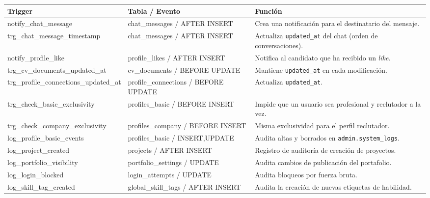 \clearpage
\vspace{0.2cm}
\noindent
\renewcommand{\arraystretch}{1.25}
\fontsize{8.2}{9.8}\selectfont\sffamily
\begin{tabularx}{\textwidth}{|>{\ttfamily\color{colorPrimario}\scriptsize}l|>{\scriptsize}l|X|}
\hline
\rowcolor{headerTabla}
\sffamily\textbf{Trigger} & \sffamily\textbf{Tabla / Evento} & \sffamily\textbf{Función} \\
\hline
notify\_chat\_message & chat\_messages / AFTER INSERT & Crea una notificación para el destinatario del mensaje. \\
\hline
\rowcolor{grisTecnico}
trg\_chat\_message\_timestamp & chat\_messages / AFTER INSERT & Actualiza \texttt{updated\_at} del chat (orden de conversaciones). \\
\hline
notify\_profile\_like & profile\_likes / AFTER INSERT & Notifica al candidato que ha recibido un \textit{like}. \\
\hline
\rowcolor{grisTecnico}
trg\_cv\_documents\_updated\_at & cv\_documents / BEFORE UPDATE & Mantiene \texttt{updated\_at} en cada modificación. \\
\hline
trg\_profile\_connections\_updated\_at & profile\_connections / BEFORE UPDATE & Actualiza \texttt{updated\_at}. \\
\hline
\rowcolor{grisTecnico}
trg\_check\_basic\_exclusivity & profiles\_basic / BEFORE INSERT & Impide que un usuario sea profesional y reclutador a la vez. \\
\hline
trg\_check\_company\_exclusivity & profiles\_company / BEFORE INSERT & Misma exclusividad para el perfil reclutador. \\
\hline
\rowcolor{grisTecnico}
log\_profile\_basic\_events & profiles\_basic / INSERT,UPDATE & Audita altas y borrados en \texttt{admin.system\_logs}. \\
\hline
log\_project\_created & projects / AFTER INSERT & Registro de auditoría de creación de proyectos. \\
\hline
\rowcolor{grisTecnico}
log\_portfolio\_visibility & portfolio\_settings / UPDATE & Audita cambios de publicación del portafolio. \\
\hline
log\_login\_blocked & login\_attempts / UPDATE & Audita bloqueos por fuerza bruta. \\
\hline
\rowcolor{grisTecnico}
log\_skill\_tag\_created & global\_skill\_tags / AFTER INSERT & Audita la creación de nuevas etiquetas de habilidad. \\
\hline
\end{tabularx}
\label{tab:triggers}

